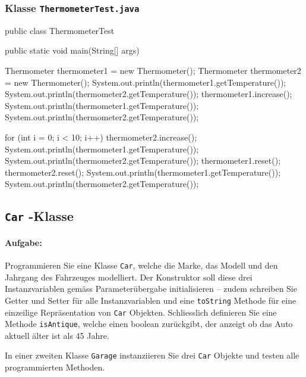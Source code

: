 \documentclass[a4paper,10pt, dvipsnames]{report}
\begin{document}
\subsubsection{Klasse \texttt{ThermometerTest.java}}

\begin{javacodebox}
public class ThermometerTest {
        
        public static void main(String[] args) {
            Thermometer thermometer1 = new Thermometer();
            Thermometer thermometer2 = new Thermometer();
            System.out.println(thermometer1.getTemperature());
            System.out.println(thermometer2.getTemperature());
            thermometer1.increase();
            System.out.println(thermometer1.getTemperature());
            System.out.println(thermometer2.getTemperature());
            
            for (int i = 0; i < 10; i++) {
                thermometer2.increase();
            }
            System.out.println(thermometer1.getTemperature());
            System.out.println(thermometer2.getTemperature());
            thermometer1.reset();
            thermometer2.reset();
            System.out.println(thermometer1.getTemperature());
            System.out.println(thermometer2.getTemperature());
        }
}
\end{javacodebox}

\subsection{\texttt{Car} -Klasse}

\paragraph{Aufgabe:}
Programmieren Sie eine Klasse \texttt{Car}, welche die Marke, das Modell und den Jahrgang des Fahrzeuges modelliert. Der Konstruktor soll diese drei Instanzvariablen gemäss Parameterübergabe initialisieren – zudem schreiben Sie Getter und Setter für alle Instanzvariablen und eine \texttt{toString} Methode für eine einzeilige Repräsentation von \texttt{Car} Objekten. Schliesslich definieren Sie eine Methode \texttt{isAntique}, welche einen boolean zurückgibt, der anzeigt ob das Auto aktuell älter ist als 45 Jahre.

In einer zweiten Klasse \texttt{Garage} instanziieren Sie drei \texttt{Car} Objekte und testen alle programmierten Methoden.
\end{document}
